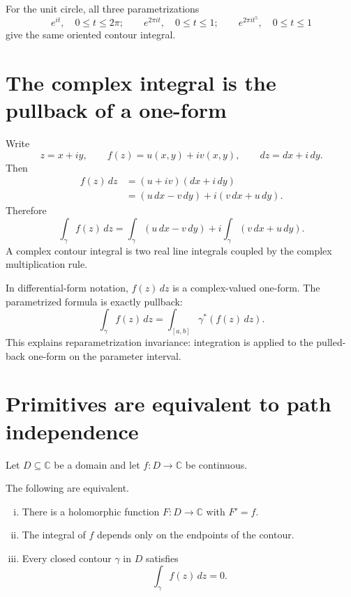 For the unit circle, all three parametrizations
\[
  e^{it},\quad 0\le t\le2\pi;
  \qquad
  e^{2\pi it},\quad 0\le t\le1;
  \qquad
  e^{2\pi i t^5},\quad 0\le t\le1
\]
give the same oriented contour integral.

\section{The complex integral is the pullback of a one-form}

Write
\[
  z=x+iy,
  \qquad
  f(z)=u(x,y)+iv(x,y),
  \qquad
  dz=dx+i\,dy.
\]
Then
\[
\begin{aligned}
  f(z)\,dz
  &=(u+iv)(dx+i\,dy)\\
  &=(u\,dx-v\,dy)
  +i(v\,dx+u\,dy).
\end{aligned}
\]
Therefore
\[
  \int_\gamma f(z)\,dz
  =\int_\gamma(u\,dx-v\,dy)
  +i\int_\gamma(v\,dx+u\,dy).
\]
A complex contour integral is two real line integrals coupled by the complex multiplication rule.

In differential-form notation, \(f(z)\,dz\) is a complex-valued one-form.  The parametrized formula is exactly pullback:
\[
  \int_\gamma f(z)\,dz
  =\int_{[a,b]}\gamma^*(f(z)\,dz).
\]
This explains reparametrization invariance: integration is applied to the pulled-back one-form on the parameter interval.

\section{Primitives are equivalent to path independence}

Let \(D\subseteq\mathbb C\) be a domain and let \(f:D\to\mathbb C\) be continuous.

\begin{theorem}
The following are equivalent.
\begin{enumerate}[(i)]
  \item There is a holomorphic function \(F:D\to\mathbb C\) with \(F'=f\).
  \item The integral of \(f\) depends only on the endpoints of the contour.
  \item Every closed contour \(\gamma\) in \(D\) satisfies
  \[
    \int_\gamma f(z)\,dz=0.
  \]
\end{enumerate}
\end{theorem}

